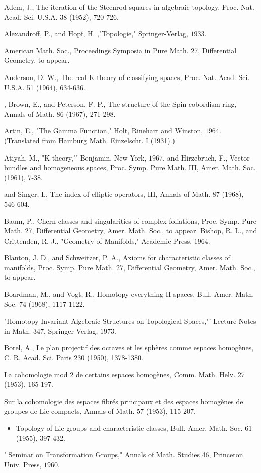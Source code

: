 \documentclass[10pt]{article}
\begin{document}
Adem, J., The iteration of the Steenrod squares in algebraic topology, Proc. Nat. Acad. Sci. U.S.A. 38 (1952), 720-726.

Alexandroff, P., and Hopf, H. ,"Topologie," Springer-Verlag, $1933 .$

American Math. Soc., Proceedings Symposia in Pure Math. 27, Differential Geometry, to appear.

Anderson, D. W., The real K-theory of classifying spaces, Proc. Nat. Acad. Sci. U.S.A. 51 (1964), 634-636.

, Brown, E., and Peterson, F. P., The structure of the Spin cobordism ring, Annals of Math. 86 (1967), 271-298.

Artin, E., "The Gamma Function," Holt, Rinehart and Winston, $1964 .$ (Translated from Hamburg Math. Einzelschr. I (1931).)

Atiyah, M., "K-theory,'" Benjamin, New York, $1967 .$ and Hirzebruch, F., Vector bundles and homogeneous spaces, Proc. Symp. Pure Math. III, Amer. Math. Soc. (1961), 7-38.

and Singer, I., The index of elliptic operators, III, Annals of Math. 87 (1968), 546-604.

Baum, P., Chern classes and singularities of complex foliations, Proc. Symp. Pure Math. 27, Differential Geometry, Amer. Math. Soc., to appear. Bishop, R. L., and Crittenden, R. J., "Geometry of Manifolds," Academic Press, $1964 .$

Blanton, J. D., and Schweitzer, P. A., Axioms for characteristic classes of manifolds, Proc. Symp. Pure Math. 27, Differential Geometry, Amer. Math. Soc., to appear.

Boardman, M., and Vogt, R., Homotopy everything H-spaces, Bull. Amer. Math. Soc. 74 (1968), 1117-1122.

"Homotopy Invariant Algebraic Structures on Topological Spaces,"' Lecture Notes in Math. 347, Springer-Verlag, $1973 .$

Borel, A., Le plan projectif des octaves et les sphères comme espaces homogènes, C. R. Acad. Sci. Paris 230 (1950), 1378-1380.

La cohomologie mod 2 de certains espaces homogènes, Comm. Math. Helv. 27 (1953), 165-197.

Sur la cohomologie des espaces fibrés principaux et des espaces homogènes de groupes de Lie compacts, Annals of Math. 57 (1953), 115-207.

\begin{itemize}
  \item Topology of Lie groups and characteristic classes, Bull. Amer. Math. Soc. 61 (1955), 397-432.
\end{itemize}
' Seminar on Transformation Groups," Annals of Math. Studies 46, Princeton Univ. Press, $1960 .$
\end{document}
